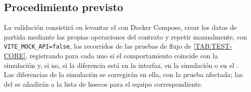 \subsection{Procedimiento previsto}

La validación consistirá en levantar el  con Docker Compose, crear los datos de
partida mediante las propias operaciones del contrato y repetir manualmente, con
\texttt{VITE\_MOCK\_API=false}, los recorridos de las pruebas de flujo de
\cref{TAB:TEST-CORE}, registrando para cada uno si el comportamiento coincide con la
simulación y, si no, si la diferencia está en la interfaz, en la simulación o en el
. Las diferencias de la simulación se corregirán en ella, con la prueba
afectada; las del  se añadirán a la lista de huecos para el equipo
correspondiente.

